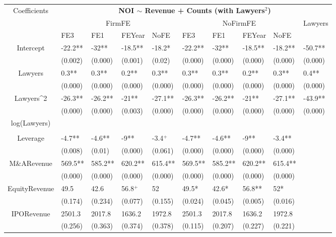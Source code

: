 \documentclass{article}
\begin{document}
\begin{table}[H]
\centering
\begin{tabular}{|clllllllll|}
\hline
\multirow{3}{*}{Coefficients} & \multicolumn{9}{c|}{\textbf{NOI $\sim$ Revenue + Counts (with Lawyers$^2$)}} \\
\cline{2-10}
& \multicolumn{4}{c}{FirmFE} & \multicolumn{4}{c}{NoFirmFE} & \multirow{2}{*}{Lawyers} \\
\cline{2-9}
& FE3 & FE1 & FEYear & NoFE & FE3 & FE1 & FEYear & NoFE &  \\
\hline
 
Intercept & -22.2** & -32** & -18.5** & -18.2* & -22.2** & -32** & -18.5** & -18.2** & -50.7** \\ 
   & (0.002) & (0.000) & (0.001) & (0.02) & (0.000) & (0.000) & (0.000) & (0.000) & (0.000) \\ 
  Lawyers & 0.3** & 0.3** & 0.2** & 0.3** & 0.3** & 0.3** & 0.2** & 0.3** & 0.4** \\ 
   & (0.000) & (0.000) & (0.000) & (0.000) & (0.000) & (0.000) & (0.000) & (0.000) & (0.000) \\ 
  Lawyers^2 & -26.3** & -26.2** & -21** & -27.1** & -26.3** & -26.2** & -21** & -27.1** & -43.9** \\ 
   & (0.000) & (0.000) & (0.003) & (0.000) & (0.000) & (0.000) & (0.000) & (0.000) & (0.000) \\ 
  log(Lawyers) &  &  &  &  &  &  &  &  &  \\ 
   &  &  &  &  &  &  &  &  &  \\ 
  Leverage & -4.7** & -4.6** & -9** & -3.4$^{+}$ & -4.7** & -4.6** & -9** & -3.4** &  \\ 
   & (0.008) & (0.01) & (0.000) & (0.061) & (0.000) & (0.000) & (0.000) & (0.000) &  \\ 
  M\&ARevenue & 569.5** & 585.2** & 620.2** & 615.4** & 569.5** & 585.2** & 620.2** & 615.4** &  \\ 
   & (0.000) & (0.000) & (0.000) & (0.000) & (0.000) & (0.000) & (0.000) & (0.000) &  \\ 
  EquityRevenue & 49.5 & 42.6 & 56.8$^{+}$ & 52 & 49.5* & 42.6* & 56.8** & 52* &  \\ 
   & (0.174) & (0.234) & (0.077) & (0.155) & (0.024) & (0.045) & (0.005) & (0.016) &  \\ 
  IPORevenue & 2501.3 & 2017.8 & 1636.2 & 1972.8 & 2501.3 & 2017.8 & 1636.2 & 1972.8 &  \\ 
   & (0.256) & (0.363) & (0.374) & (0.378) & (0.115) & (0.207) & (0.227) & (0.221) &  \\ 

\end{tabular}
\end{table}
\end{document}
